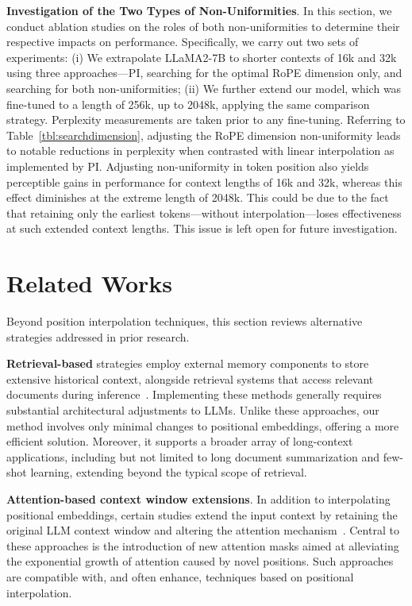 \textbf{Investigation of the Two Types of Non-Uniformities}. In this section, we conduct ablation studies on the roles of both non-uniformities to determine their respective impacts on performance. Specifically, we carry out two sets of experiments: (i) We extrapolate LLaMA2-7B to shorter contexts of 16k and 32k using three approaches—PI, searching for the optimal RoPE dimension only, and searching for both non-uniformities; (ii) We further extend our model, which was fine-tuned to a length of 256k, up to 2048k, applying the same comparison strategy. Perplexity measurements are taken prior to any fine-tuning. Referring to Table~\ref{tbl:searchdimension}, adjusting the RoPE dimension non-uniformity leads to notable reductions in perplexity when contrasted with linear interpolation as implemented by PI. Adjusting non-uniformity in token position also yields perceptible gains in performance for context lengths of 16k and 32k, whereas this effect diminishes at the extreme length of 2048k. This could be due to the fact that retaining only the earliest tokens—without interpolation—loses effectiveness at such extended context lengths. This issue is left open for future investigation.

\section{Related Works}

Beyond position interpolation techniques, this section reviews alternative strategies addressed in prior research.

\textbf{Retrieval-based} strategies employ external memory components to store extensive historical context, alongside retrieval systems that access relevant documents during inference~\cite{longllama,wang2023augmenting,borgeaud2022improving}. Implementing these methods generally requires substantial architectural adjustments to LLMs. Unlike these approaches, our method involves only minimal changes to positional embeddings, offering a more efficient solution. Moreover, it supports a broader array of long-context applications, including but not limited to long document summarization and few-shot learning, extending beyond the typical scope of retrieval.

\textbf{Attention-based context window extensions}. In addition to interpolating positional embeddings, certain studies extend the input context by retaining the original LLM context window and altering the attention mechanism~\cite{han2023lminfinite, streamingllm,parallelwindow}. Central to these approaches is the introduction of new attention masks aimed at alleviating the exponential growth of attention caused by novel positions. Such approaches are compatible with, and often enhance, techniques based on positional interpolation.

